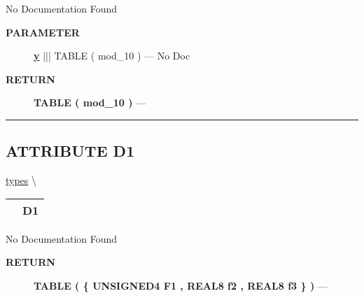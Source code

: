 \par





No Documentation Found






\par
\begin{description}
\item [\colorbox{tagtype}{\color{white} \textbf{\textsf{PARAMETER}}}] \textbf{\underline{y}} ||| TABLE ( mod\_10 ) --- No Doc
\end{description}







\par
\begin{description}
\item [\colorbox{tagtype}{\color{white} \textbf{\textsf{RETURN}}}] \textbf{TABLE ( mod\_10 )} --- 
\end{description}




\rule{\linewidth}{0.5pt}
\subsection*{\textsf{\colorbox{headtoc}{\color{white} ATTRIBUTE}
D1}}

\hypertarget{ecldoc:types.d1}{}
\hspace{0pt} \hyperlink{ecldoc:types}{types} \textbackslash 

{\renewcommand{\arraystretch}{1.5}
\begin{tabularx}{\textwidth}{|>{\raggedright\arraybackslash}l|X|}
\hline
\hspace{0pt}\mytexttt{\color{red} } & \textbf{D1} \\
\hline
\end{tabularx}
}

\par





No Documentation Found








\par
\begin{description}
\item [\colorbox{tagtype}{\color{white} \textbf{\textsf{RETURN}}}] \textbf{TABLE ( \{ UNSIGNED4 F1 , REAL8 f2 , REAL8 f3 \} )} --- 
\end{description}




